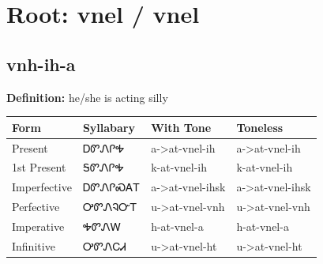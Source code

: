 \documentclass{article}%
\begin{document}
%
\normalsize%
\section*{Root: vnel / vnel}%
\subsection*{vnh-ih-a}%
\textbf{Definition: }%
he/she is acting silly%
\\[0.5em]%
\begin{tabular}{|l|l|l|l|}%
\hline%
\textbf{Form}&\textbf{Syllabary}&\textbf{With Tone}&\textbf{Toneless}\\%
\hline%
Present&ᎠᏛᏁᎵᎭ&a{-}>at{-}vnel{-}ih&a{-}>at{-}vnel{-}ih\\%
1st Present&ᎦᏛᏁᎵᎭ&k{-}at{-}vnel{-}ih&k{-}at{-}vnel{-}ih\\%
Imperfective&ᎠᏛᏁᎵᏍᎪᎢ&a{-}>at{-}vnel{-}ihsk&a{-}>at{-}vnel{-}ihsk\\%
Perfective&ᎤᏛᏁᎸᏅᎢ&u{-}>at{-}vnel{-}vnh&u{-}>at{-}vnel{-}vnh\\%
Imperative&ᎭᏛᏁᎳ&h{-}at{-}vnel{-}a&h{-}at{-}vnel{-}a\\%
Infinitive&ᎤᏛᏁᏟᏗ&u{-}>at{-}vnel{-}ht&u{-}>at{-}vnel{-}ht\\%
\hline%
\end{tabular}%
\\[1em]%
\end{document}
